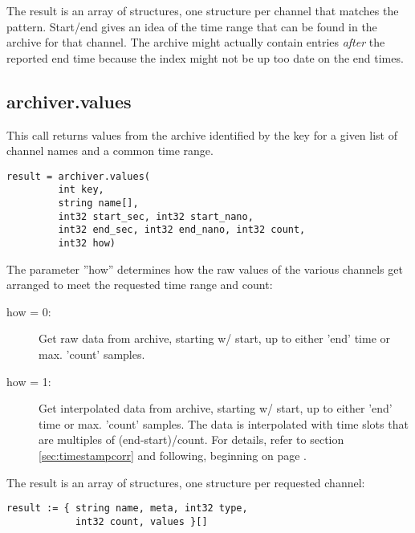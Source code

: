 \noindent The result is an array of structures, one structure
per channel that matches the pattern.
Start/end gives an idea of the time range that can
be found in the archive for that channel.
The archive might actually contain entries \emph{after}
the reported end time because the index might not
be up too date on the end times.

\subsection{archiver.values} %
This call returns values from the archive identified by the key for a
given list of channel names and a common time range.

\begin{lstlisting}[keywordstyle=\sffamily]
result = archiver.values(
         int key,
         string name[],
         int32 start_sec, int32 start_nano,
         int32 end_sec, int32 end_nano, int32 count,
         int32 how)
\end{lstlisting}

\noindent The parameter ''how'' determines how the raw values of the various
channels get arranged to meet the requested time range and count:
\begin{description}
\item[\sffamily how = 0:]
  Get raw data from archive, starting w/ start,
  up to either 'end' time or max. 'count' samples.
\item[\sffamily how = 1:]
  Get interpolated data from archive, starting w/ start,
  up to either 'end' time or max. 'count' samples.
  The data is interpolated with time slots that are multiples
  of (end-start)/count.
  For details, refer to section \ref{sec:timestampcorr} and following,
  beginning on page \pageref{sec:timestampcorr}.
\end{description}

\noindent The result is an array of structures, one structure per
requested channel:

\begin{lstlisting}[keywordstyle=\sffamily]
result := { string name, meta, int32 type,
            int32 count, values }[]
\end{lstlisting}

